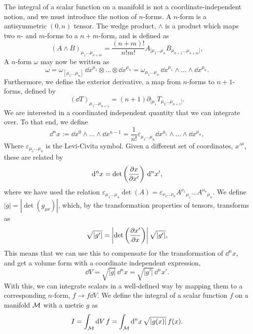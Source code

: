 The integral of a scalar function on a manifold is not a coordinate-independent notion, and we must introduce the notion of $n$-forms.
A $n$-form is a antisymmetric $(0, n)$ tensor.
The wedge product, $\wedge$ is a product which maps two $n$- and $m$-forms to a $n+m$-form, and is defined as
%
\begin{equation}
    (A\wedge B)_{\mu_1\dots\mu_{n+m}} = \frac{(n + m)!}{n! m!} A_{[\mu_1\dots\mu_n}B_{\mu_{n+1}\dots\mu_{n+m}]},
\end{equation}
%
A $n$-form $\omega$ may now be written as
%
\begin{equation}
    \omega 
    = \omega_{[\mu_1 \dots \mu_n]} \, \dd x^{\mu_1} \otimes \dots \otimes \dd x^{\mu_n}
    = \omega_{\mu_1 \dots \mu_n} \, \dd x^{\mu_1} \wedge \dots \wedge \dd x^{\mu_n}.
\end{equation}
% 
Furthermore, we define the exterior derivative, a map from $n$-forms to $n+1$-forms, defined by
%
\begin{equation}
    (\dd T)_{\mu_1 \dots \mu_{n+1}} = (n+1) \partial_{[\mu_1} T_{\mu_2\dots\mu_{n+1}]}.
\end{equation}
%
We are interested in a coordinated independent quantity that we can integrate over.
To that end, we define
%
\begin{equation}
    \dd^n x := \dd x^0 \wedge \dots \wedge \dd x^{n-1}
    = \frac{1}{n!} \varepsilon_{\mu_1 \dots \mu_n}  
    \dd x^{\mu_1} \wedge \dots \wedge \dd x^{\mu_n},
\end{equation}
%
Where $\varepsilon_{\mu_1 \dots \mu_n}$ is the Levi-Civita symbol.
Given a different set of coordinates, $x'^\mu$, these are related by
%
\begin{equation}
    \dd^n x = \det\left( \pdv{x}{x'} \right) \, \dd^n x',
\end{equation}
%
where we have used the relation $\varepsilon_{\mu_1 \dots \mu_n}  \det(A) = \varepsilon_{\nu_1 \dots \nu_n} A^{\nu_1}{}_{\mu_1} \dots A^{\nu_n}{}_{\mu_n}$.  
We define $|g| = |\det(g_{\mu \nu })|$, which, by the transformation properties of tensors, transforms as
%
\begin{equation}
    \sqrt{|g'|} = \left| \det\left(\pdv{x'}{x} \right) \right| \sqrt{|g'|},
\end{equation}
%
This means that we can use this to compensate for the transformation of $\dd^n x$, and get a volume form with a coordinate independent expression,
%
\begin{equation}
    \dd V = \sqrt{|g|} \, \dd^n x = \sqrt{|g'|} \, \dd^n x'.
\end{equation}
%
With this, we can integrate scalars in a well-defined way by mapping them to a corresponding $n$-form, $f \rightarrow f \dd V$.
We define the integral of a scalar function $f$ on a manifold $\mathcal{M}$ with a metric $g$ as
%
\begin{equation}
    I = \int_{\mathcal{M}} \dd V \, f =  \int_{\mathcal{M}} \dd^n x \, \sqrt{|g(x)|} \, f(x).  
\end{equation}



